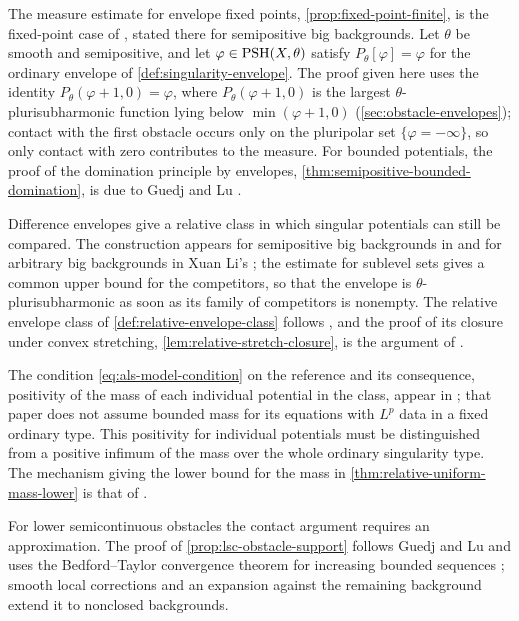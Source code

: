 The measure estimate for envelope fixed points, \cref{prop:fixed-point-finite}, is the fixed-point case of \cite[Proposition~2.13, p.~14]{ALS26}, stated there for semipositive big backgrounds. Let $\theta$ be smooth and semipositive, and let $\varphi\in\mathrm{PSH}(X,\theta)$ satisfy $P_\theta[\varphi]=\varphi$ for the ordinary envelope of \cref{def:singularity-envelope}. The proof given here uses the identity $P_\theta(\varphi+1,0)=\varphi$, where $P_\theta(\varphi+1,0)$ is the largest $\theta$-plurisubharmonic function lying below $\min(\varphi+1,0)$ (\cref{sec:obstacle-envelopes}); contact with the first obstacle occurs only on the pluripolar set $\{\varphi=-\infty\}$, so only contact with zero contributes to the measure. For bounded potentials, the proof of the domination principle by envelopes, \cref{thm:semipositive-bounded-domination}, is due to Guedj and Lu \cite[Proposition 2.8]{GL22}.

Difference envelopes give a relative class in which singular potentials can still be compared. The construction appears for semipositive big backgrounds in \cite[Proposition~2.4 and Lemma~2.6, pp.~8--9]{ALS26} and for arbitrary big backgrounds in Xuan Li's \cite[v1, Section 2.1]{XL26}; the estimate for sublevel sets gives a common upper bound for the competitors, so that the envelope is $\theta$-plurisubharmonic as soon as its family of competitors is nonempty. The relative envelope class of \cref{def:relative-envelope-class} follows \cite[Definition~3.2, p.~16]{ALS26}, and the proof of its closure under convex stretching, \cref{lem:relative-stretch-closure}, is the argument of \cite[Proposition~3.5, p.~19]{ALS26}.

The condition \eqref{eq:als-model-condition} on the reference and its consequence, positivity of the mass of each individual potential in the class, appear in \cite[Proposition~2.11, the discussion after Definition~2.14, and Remark~3.9, pp.~13, 15 and~20]{ALS26}; that paper does not assume bounded mass for its equations with $L^p$ data in a fixed ordinary type. This positivity for individual potentials must be distinguished from a positive infimum of the mass over the whole ordinary singularity type. The mechanism giving the lower bound for the mass in \cref{thm:relative-uniform-mass-lower} is that of \cite[Proposition~3.8, p.~20]{ALS26}.

For lower semicontinuous obstacles the contact argument requires an approximation. The proof of \cref{prop:lsc-obstacle-support} follows Guedj and Lu \cite[Theorem 2.3]{GL22} and uses the Bedford--Taylor convergence theorem for increasing bounded sequences \cite[Theorem~7.4, p.~27]{BT82}; smooth local corrections and an expansion against the remaining background extend it to nonclosed backgrounds.

